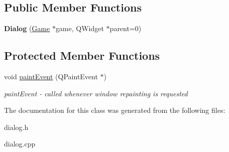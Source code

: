 \subsection*{Public Member Functions}
\begin{DoxyCompactItemize}
\item 
\mbox{\label{class_dialog_a50ae9716ee548a6f31fc5d0a29347899}} 
{\bfseries Dialog} (\mbox{\hyperlink{class_game}{Game}} $\ast$game, Q\+Widget $\ast$parent=0)
\end{DoxyCompactItemize}
\subsection*{Protected Member Functions}
\begin{DoxyCompactItemize}
\item 
\mbox{\label{class_dialog_a93e4c843803f26bfe5746529cf163ec5}} 
void \mbox{\hyperlink{class_dialog_a93e4c843803f26bfe5746529cf163ec5}{paint\+Event}} (Q\+Paint\+Event $\ast$)
\begin{DoxyCompactList}\small\item\em paint\+Event -\/ called whenever window repainting is requested \end{DoxyCompactList}\end{DoxyCompactItemize}


The documentation for this class was generated from the following files\+:\begin{DoxyCompactItemize}
\item 
dialog.\+h\item 
dialog.\+cpp\end{DoxyCompactItemize}
